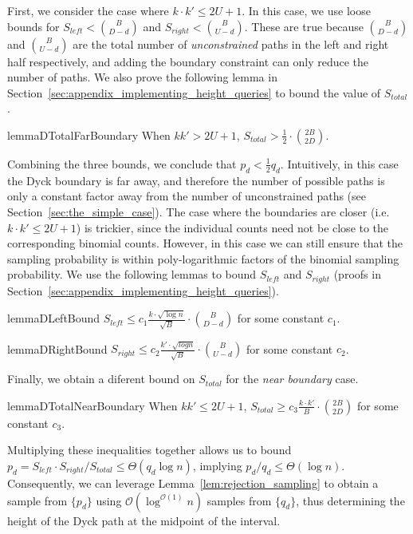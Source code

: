 First, we consider the case where $k\cdot k'\le 2U+1$.
In this case, we use loose bounds for $S_{left} < \binom{B}{D-d}$ and $S_{right} < \binom{B}{U-d}$.
These are true because $\binom{B}{D-d}$ and $\binom{B}{U-d}$ are the total number of \emph{unconstrained} paths
in the left and right half respectively, and adding the boundary constraint can only reduce the number of paths.
We also prove the following lemma in Section~\ref{sec:appendix_implementing_height_queries} to bound the value of $S_{total}$.
\begin{restatable}{lemma}{DTotalFarBoundary}
\label{lem:DTotalFarBoundary}
When $kk' > 2U + 1$, $S_{total} > \frac 12\cdot \binom{2B}{2D}$.
\end{restatable}

Combining the three bounds, we conclude that $p_d < \frac 12 q_d$.
Intuitively, in this case the Dyck boundary is far away, and therefore the number of possible paths
is only a constant factor away from the number of unconstrained paths (see Section~\ref{sec:the_simple_case}).
The case where the boundaries are closer (i.e. $k\cdot k' \le 2U+1$) is trickier,
since the individual counts need not be close to the corresponding binomial counts.
However, in this case we can still ensure that the sampling probability is within poly-logarithmic factors of the binomial sampling probability.
We use the following lemmas to bound $S_{left}$ and $S_{right}$ (proofs in Section~\ref{sec:appendix_implementing_height_queries}).
\begin{restatable}{lemma}{DLeftBound}
\label{lem:DLeftBound}
$S_{left} \le c_1 \frac{ k\cdot\sqrt{\log n}}{\sqrt{B}}\cdot{{B}\choose{D-d}}$ for some constant $c_1$.
\end{restatable}
\begin{restatable}{lemma}{DRightBound}
\label{lem:DRightBound}
$S_{right} \le c_2 \frac{k'\cdot \sqrt{log n}}{\sqrt{B}}\cdot{{B}\choose{U-d}}$ for some constant $c_2$.
\end{restatable}

Finally, we obtain a diferent bound on $S_{total}$ for the \emph{near boundary} case.
\begin{restatable}{lemma}{DTotalNearBoundary}
\label{lem:DTotalNearBoundary}
When $kk' \le 2U + 1$, $S_{total} \ge c_3 \frac{k\cdot k'}{B}\cdot{{2B}\choose{2D}}$ for some constant $c_3$.
\end{restatable}

Multiplying these inequalities together allows us to bound $p_d = S_{left}\cdot S_{right}/S_{total} \le \Theta(q_d\log n)$,
implying $p_d/q_d \le \Theta(\log n)$.
Consequently, we can leverage Lemma~\ref{lem:rejection_sampling} to obtain a sample from $\{ p_d\}$
using $\mathcal O(\log^{\mathcal O(1)}n)$ samples from $\{ q_d\}$,
thus determining the height of the Dyck path at the midpoint of the interval.

